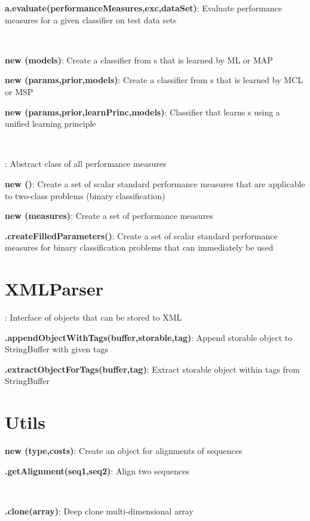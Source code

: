 \documentclass[10pt]{scrartcl}
\newcommand{\entry}[3]{{\bfseries #1#2}: #3}
\begin{document}
\begin{flushleft}
\entry{a}{.evaluate(performanceMeasures,exc,dataSet)}{Evaluate performance measures for a given classifier on test data sets}

~

\entry{new \TrainSMBasedClassifier}{(models)}{Create a classifier from \TrainSM s that is learned by ML or MAP}

\entry{new \MSPClassifier}{(params,prior,models)}{Create a classifier from \DiffSM s that is learned by MCL or MSP}

\entry{new \GenDisMixClassifier}{(params,prior,learnPrinc,models)}{Classifier that learns \DiffSM s using a unified learning principle}

~

\entry{\AbstractPerformanceMeasure}{}{Abstract class of all performance measures}

\entry{new \NumericalPerformanceMeasureParameterSet}{()}{Create a set of scalar standard performance measures that are applicable to two-class problems (binary classification)}

\entry{new \PerformanceMeasureParameterSet}{(measures)}{Create a set of performance measures}

\entry{\PerformanceMeasureParameterSet}{.createFilledParameters()}{Create a set of scalar standard performance measures for binary classification problems that can immediately be used}

\section{XMLParser}

\entry{\Storable}{}{Interface of objects that can be stored to XML}

\entry{\XMLParser}{.appendObjectWithTags(buffer,storable,tag)}{Append storable object to StringBuffer with given tags}

\entry{\XMLParser}{.extractObjectForTags(buffer,tag)}{Extract storable object within tags from StringBuffer}

\section{Utils}

\entry{new \Alignment}{(type,costs)}{Create an object for alignments of sequences}

\entry{\Alignment}{.getAlignment(seq1,seq2)}{Align two sequences}

~

\entry{\ArrayHandler}{.clone(array)}{Deep clone multi-dimensional array}


\end{flushleft}
\end{document}
